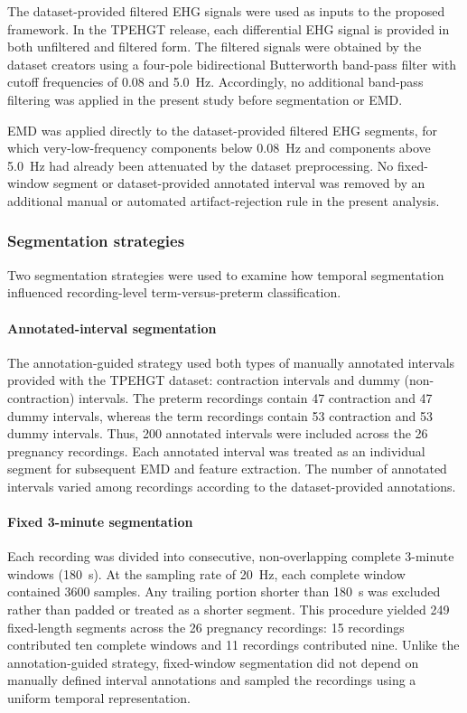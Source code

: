 \documentclass[10pt,letterpaper]{article}
\begin{document}
The dataset-provided filtered EHG signals were used as inputs to the proposed framework. In the TPEHGT release, each differential EHG signal is provided in both unfiltered and filtered form. The filtered signals were obtained by the dataset creators using a four-pole bidirectional Butterworth band-pass filter with cutoff frequencies of 0.08 and 5.0~Hz. Accordingly, no additional band-pass filtering was applied in the present study before segmentation or EMD.

EMD was applied directly to the dataset-provided filtered EHG segments, for which very-low-frequency components below 0.08~Hz and components above 5.0~Hz had already been attenuated by the dataset preprocessing. No fixed-window segment or dataset-provided annotated interval was removed by an additional manual or automated artifact-rejection rule in the present analysis.

\subsubsection*{Segmentation strategies}

Two segmentation strategies were used to examine how temporal segmentation influenced recording-level term-versus-preterm classification.

\paragraph{Annotated-interval segmentation}

The annotation-guided strategy used both types of manually annotated intervals provided with the TPEHGT dataset: contraction intervals and dummy (non-contraction) intervals. The preterm recordings contain 47 contraction and 47 dummy intervals, whereas the term recordings contain 53 contraction and 53 dummy intervals. Thus, 200 annotated intervals were included across the 26 pregnancy recordings. Each annotated interval was treated as an individual segment for subsequent EMD and feature extraction. The number of annotated intervals varied among recordings according to the dataset-provided annotations.

\paragraph{Fixed 3-minute segmentation}

Each recording was divided into consecutive, non-overlapping complete 3-minute windows (180~s). At the sampling rate of 20~Hz, each complete window contained 3600 samples. Any trailing portion shorter than 180~s was excluded rather than padded or treated as a shorter segment. This procedure yielded 249 fixed-length segments across the 26 pregnancy recordings: 15 recordings contributed ten complete windows and 11 recordings contributed nine. Unlike the annotation-guided strategy, fixed-window segmentation did not depend on manually defined interval annotations and sampled the recordings using a uniform temporal representation.
\end{document}
